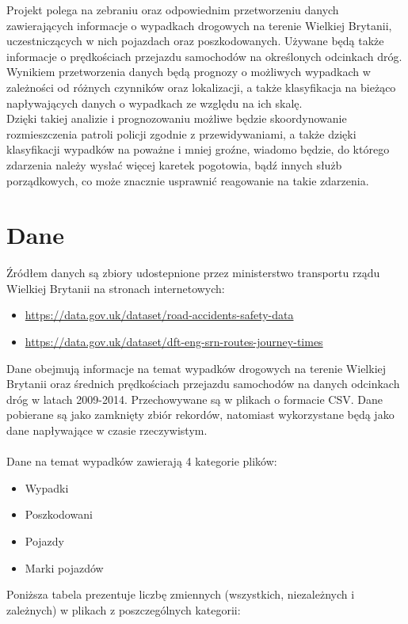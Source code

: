 \documentclass{article}
\begin{document}
Projekt polega na zebraniu oraz odpowiednim przetworzeniu danych zawierających informacje o wypadkach drogowych na terenie Wielkiej Brytanii, uczestniczących w nich pojazdach oraz poszkodowanych. Używane będą także informacje o prędkościach przejazdu samochodów na określonych odcinkach dróg. \\

Wynikiem przetworzenia danych będą prognozy o możliwych wypadkach w zależności od różnych czynników oraz lokalizacji, a także klasyfikacja na bieżąco napływających danych o wypadkach ze względu na ich skalę.\\

Dzięki takiej analizie i prognozowaniu możliwe będzie skoordynowanie rozmieszczenia  patroli policji zgodnie z przewidywaniami, a także dzięki klasyfikacji wypadków na poważne i mniej groźne, wiadomo będzie, do którego zdarzenia należy wysłać więcej karetek pogotowia, bądź innych służb porządkowych, co może znacznie usprawnić reagowanie na takie zdarzenia.


\section{Dane}

Źródłem danych są zbiory udostepnione przez ministerstwo transportu rządu Wielkiej Brytanii na stronach internetowych:
\begin{itemize}
    \item \url{https://data.gov.uk/dataset/road-accidents-safety-data}
    \item \url{https://data.gov.uk/dataset/dft-eng-srn-routes-journey-times}
\end{itemize}
Dane obejmują informacje na temat wypadków drogowych na terenie Wielkiej Brytanii oraz średnich prędkościach przejazdu samochodów na danych odcinkach dróg w latach 2009-2014. Przechowywane są w plikach o formacie CSV. Dane pobierane są jako zamknięty zbiór rekordów, natomiast wykorzystane będą jako dane napływające w czasie rzeczywistym. \\\\
Dane na temat wypadków zawierają 4 kategorie plików:
\begin{itemize}
    \item Wypadki
    \item Poszkodowani
    \item Pojazdy
    \item Marki pojazdów
\end{itemize}
Poniższa tabela prezentuje liczbę zmiennych (wszystkich, niezależnych i zależnych) w plikach z poszczególnych kategorii:\\
\end{document}
